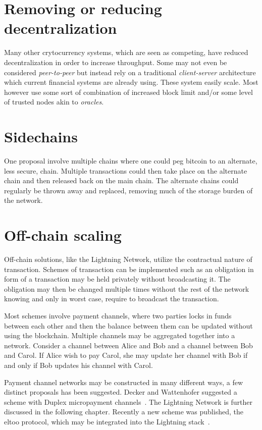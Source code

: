 \section{Removing or reducing decentralization}

Many other crytocurrency systems, which are seen as competing, have reduced decentralization in order to increase throughput. Some may not even be considered \textit{peer-to-peer} but instead rely on a traditional \textit{client-server} architecture which current financial systems are already using. These system easily scale. Most however use some sort of combination of increased block limit and/or some level of trusted nodes akin to \textit{oracles}.  

\section{Sidechains}

One proposal involve multiple chains where one could peg bitcoin to an alternate, less secure, chain. Multiple transactions could then take place on the alternate chain and then released back on the main chain. The alternate chains could regularly be thrown away and replaced, removing much of the storage burden of the network.~\cite{blockstream:sidechain}

\section{Off-chain scaling}

Off-chain solutions, like the \gls{Lightning Network}, utilize the contractual nature of transaction. Schemes of transaction can be implemented such as an obligation in form of a transaction may be held privately without broadcasting it. The obligation may then be changed multiple times without the rest of the network knowing and only in worst case, require to broadcast the transaction. 

Most schemes involve payment channels, where two parties locks in funds between each other and then the balance between them can be updated without using the blockchain. Multiple channels may be aggregated together into a network. Consider a channel between Alice and Bob and a channel between Bob and Carol. If Alice wish to pay Carol, she may update her channel with Bob if and only if Bob updates his channel with Carol.  

Payment channel networks may be constructed in many different ways, a few distinct proposals has been suggested. Decker and Wattenhofer suggested a scheme with Duplex micropayment channels~\cite{decker:wattenhofer:duplex}. The \gls{Lightning Network} is further discussed in the following chapter. Recently a new scheme was published, the eltoo protocol, which may be integrated into the Lightning stack~\cite{decker:russell:Osuntokun:eltoo}.   

